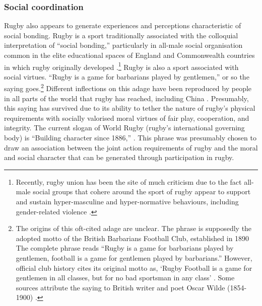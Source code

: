 \begin{CJK}{UTF8}{gbsn}
\subsubsection{Social coordination}
Rugby also appears to generate experiences and perceptions characteristic of social bonding.  Rugby is a sport traditionally associated with the colloquial interpretation of ``social bonding,'' particularly in all-male social organisation common in the elite educational spaces of England and Commonwealth countries in which rugby originally developed \citep{Dunning2005,Richards2007,Collins2008}.\footnote{Recently, rugby union has been the site of much criticism due to the fact all-male social groups that cohere around the sport of rugby appear to support and sustain hyper-masculine and hyper-normative behaviours, including gender-related violence \citep{Cosslett2014}.}  Rugby is also a sport associated with social virtues.  ``Rugby is a game for barbarians played by gentlemen,'' or so the saying goes.\footnote{The origins of this oft-cited adage are unclear.  The phrase is supposedly the adopted motto of the British Barbarians Football Club, established in 1890 \citep[34]{Dunning2005}  The complete phrase reads ``Rugby is a game for barbarians played by gentlemen, football is a game for gentlemen played by barbarians.''  However, official club history cites its original motto as, ‘Rugby Football is a game for gentlemen in all classes, but for no bad sportsman in any class' \citep[vii]{Starmer-Smith1977}.  Some sources attribute the saying to British writer and poet Oscar Wilde (1854-1900) \citep{Fleenor2015}.}
Different inflections on this adage have been reproduced by people in all parts of the world that rugby has reached, including China \citep[see][]{Taylor2010}.  Presumably, this saying has survived due to its ability to tether the nature of rugby's physical requirements with socially valorised moral virtues of fair play, cooperation, and integrity.  The current slogan of World Rugby (rugby's international governing body) is ``Building character since 1886,'' \citep{WorldRugby2017}.  This phrase was presumably chosen to draw an association between the joint action requirements of rugby and the moral and social character that can be generated through participation in rugby.


\end{CJK}
